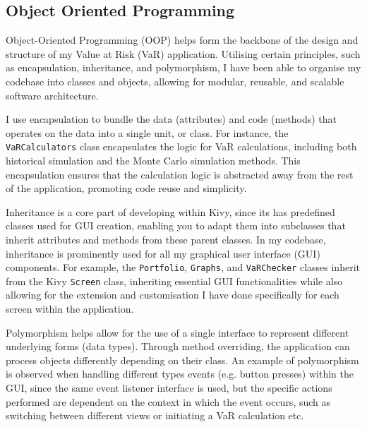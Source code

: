 \documentclass{article}
\begin{document}
\subsection{Object Oriented Programming}

Object-Oriented Programming (OOP) helps form the backbone of the design and structure of my Value at Risk (VaR) application. Utilising certain principles, such as encapsulation, inheritance, and polymorphism, I have been able to organise my codebase into classes and objects, allowing for modular, reusable, and scalable software architecture.\\\vspace{0.3cm}

I use encapsulation to bundle the data (attributes) and code (methods) that operates on the data into a single unit, or class. For instance, the \texttt{VaRCalculators} class encapsulates the logic for VaR calculations, including both historical simulation and the Monte Carlo simulation methods. This encapsulation ensures that the calculation logic is abstracted away from the rest of the application, promoting code reuse and simplicity.\\\vspace{0.3cm}

Inheritance is a core part of developing within Kivy, since its has predefined classes used for GUI creation, enabling you to adapt them into subclasses that inherit attributes and methods from these parent classes. In my codebase, inheritance is prominently used for all my graphical user interface (GUI) components. For example, the \texttt{Portfolio}, \texttt{Graphs}, and \texttt{VaRChecker} classes inherit from the Kivy \texttt{Screen} class, inheriting essential GUI functionalities while also allowing for the extension and customisation I have done specifically for each screen within the application.\\\vspace{0.3cm}

Polymorphism helps allow for the use of a single interface to represent different underlying forms (data types). Through method overriding, the application can process objects differently depending on their class. An example of polymorphism is observed when handling different types events (e.g. button presses) within the GUI, since the same event listener interface is used, but the specific actions performed are dependent on the context in which the event occurs, such as switching between different views or initiating a VaR calculation etc.\\\vspace{0.3cm}
\end{document}
